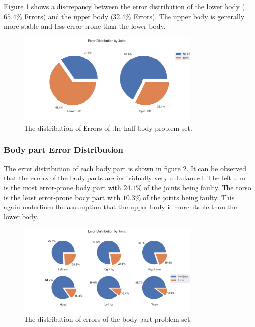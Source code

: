 Figure \ref{fig:hb_pie} shows a discrepancy between the error distribution of the lower body ($65.4\%$ Errors) and the upper body ($32.4\%$ Errors). The upper body is generally more stable and less error-prone than the lower body.

\begin{figure}[ht]
  \centering
  \includegraphics[width=0.8\textwidth]{figures/Data/dist_half_body/Error_Distribution_by_Joint.png}
  \caption[Error Distribution by Body Half]{The distribution of Errors of the half body problem set.}
  \label{fig:hb_pie}
\end{figure}

\subsubsection{Body part Error Distribution}

The error distribution of each body part is shown in figure \ref{fig:lb_pie}. It can be observed that the errors of the body parts are individually very unbalanced. The left arm is the most error-prone body part with $24.1\%$ of the joints being faulty. The torso is the least error-prone body part with $10.3\%$ of the joints being faulty. This again underlines the assumption that the upper body is more stable than the lower body.

\begin{figure}[ht]
  \centering
  \includegraphics[width=0.8\textwidth]{figures/Data/dist_limbs/Error_Distribution_by_Joint.png}
  \caption[Error Distribution by Body part]{The distribution of errors of the body part problem set.}
  \label{fig:lb_pie}
\end{figure}

